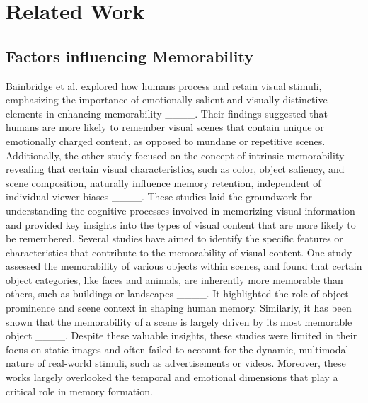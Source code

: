 \section{Related Work}
\subsection{Factors influencing Memorability}
Bainbridge et al. explored how humans process and retain visual stimuli, emphasizing the importance of emotionally salient and visually distinctive elements in enhancing memorability ____. Their findings suggested that humans are more likely to remember visual scenes that contain unique or emotionally charged content, as opposed to mundane or repetitive scenes. Additionally, the other study focused on the concept of intrinsic memorability revealing that certain visual characteristics, such as color, object saliency, and scene composition, naturally influence memory retention, independent of individual viewer biases ____. These studies laid the groundwork for understanding the cognitive processes involved in memorizing visual information and provided key insights into the types of visual content that are more likely to be remembered.
Several studies have aimed to identify the specific features or characteristics that contribute to the memorability of visual content. One study assessed the memorability of various objects within scenes, and found that certain object categories, like faces and animals, are inherently more memorable than others, such as buildings or landscapes ____. It highlighted the role of object prominence and scene context in shaping human memory. Similarly, it has been shown that the memorability of a scene is largely driven by its most memorable object ____. Despite these valuable insights, these studies were limited in their focus on static images and often failed to account for the dynamic, multimodal nature of real-world stimuli, such as advertisements or videos. Moreover, these works largely overlooked the temporal and emotional dimensions that play a critical role in memory formation.

